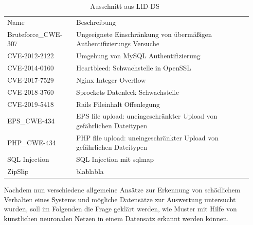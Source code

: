             \begin{table}[ht]\label{tab:scenarien}
                \small
                \centering
                \begin{tabular}{p{3cm}p{6.5cm}}
                    \rowcolor{Gray!36}
                    \hline
                    \multicolumn{2}{c}{Scenarien}\\
                    \hline
                    Name & Beschreibung \\
                    \rowcolor{Gray!16}
                    \hline
                    \hline
                    Bruteforce\_CWE-307 & Ungeeignete Einschränkung von übermäßigen Authentifizierungs Versuche \\
                    \hline
                    CVE-2012-2122 & Umgehung von MySQL Authentifizierung\\
                    \rowcolor{Gray!16}
                    \hline
                    CVE-2014-0160 & Heartbleed: Schwachstelle in OpenSSL\\
                    \hline
                    CVE-2017-7529 & Nginx Integer Overflow \\
                    \rowcolor{Gray!16}
                    \hline
                    CVE-2018-3760 & Sprockets Datenleck Schwachstelle \\
                    \hline
                    CVE-2019-5418 & Rails Fileinhalt Offenlegung \\
                    \rowcolor{Gray!16}
                    \hline
                    EPS\_CWE-434 & EPS file upload: uneingeschränkter Upload von gefährlichen Dateitypen  \\
                    \hline
                    PHP\_CWE-434 & PHP file upload: uneingeschränkter Upload von gefährlichen Dateitypen  \\
                    \rowcolor{Gray!16}
                    \hline
                    SQL Injection & SQL Injection mit sqlmap\\
                    \hline
                    ZipSlip & blablabla \\
                    \hline
                \end{tabular}
                \caption{Ausschnitt aus LID-DS~\cite{LIDDS}}
            \end{table}


            Nachdem nun verschiedene allgemeine Ansätze zur Erkennung von schädlichem Verhalten eines Systems und mögliche Datensätze zur Auswertung untersucht wurden,
            soll im Folgenden die Frage geklärt werden, wie Muster mit Hilfe von künstlichen neuronalen Netzen in einem Datensatz erkannt werden können.

